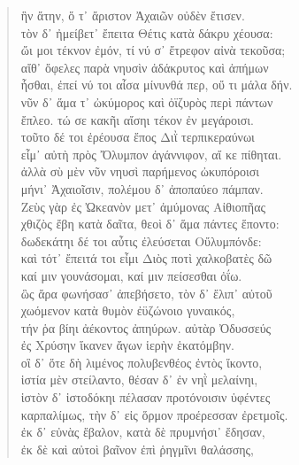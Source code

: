 \begin{Spacing}{1.5}
\begin{verse}
{\large\g ἣν ἄτην, ὅ τ᾽ ἄριστον Ἀχαιῶν οὐδὲν ἔτισεν.  } \\
{\large\g τὸν δ᾽ ἠμείβετ᾽ ἔπειτα Θέτις κατὰ δάκρυ χέουσα:  } \\
{\large\g ὤι μοι τέκνον ἐμόν, τί νύ σ᾽ ἔτρεφον αἰνὰ τεκοῦσα;  } \\
{\large\g αἴθ᾽ ὄφελες παρὰ νηυσὶν ἀδάκρυτος καὶ ἀπήμων  } \\
{\large\g ἧσθαι, ἐπεί νύ τοι αἶσα μίνυνθά περ, οὔ τι μάλα δήν.  } \\
{\large\g νῦν δ᾽ ἅμα τ᾽ ὠκύμορος καὶ ὀϊζυρὸς περὶ πάντων  } \\
{\large\g ἔπλεο. τώ σε κακῆι αἴσηι τέκον ἐν μεγάροισι.  } \\
{\large\g τοῦτο δέ τοι ἐρέουσα ἔπος Διῒ τερπικεραύνωι  } \\
{\large\g εἶμ᾽ αὐτὴ πρὸς Ὄλυμπον ἀγάννιφον, αἴ κε πίθηται.  } \\
{\large\g ἀλλὰ σὺ μὲν νῦν νηυσὶ παρήμενος ὠκυπόροισι  } \\
{\large\g μήνι᾽ Ἀχαιοῖσιν, πολέμου δ᾽ ἀποπαύεο πάμπαν.  } \\
{\large\g Ζεὺς γὰρ ἐς Ὠκεανὸν μετ᾽ ἀμύμονας Αἰθιοπῆας  } \\
{\large\g χθιζὸς ἔβη κατὰ δαῖτα, θεοὶ δ᾽ ἅμα πάντες ἕποντο:  } \\
{\large\g δωδεκάτηι δέ τοι αὖτις ἐλεύσεται Οὔλυμπόνδε:  } \\
{\large\g καὶ τότ᾽ ἔπειτά τοι εἶμι Διὸς ποτὶ χαλκοβατὲς δῶ  } \\
{\large\g καί μιν γουνάσομαι, καί μιν πείσεσθαι ὀΐω.  } \\
{\large\g ὣς ἄρα φωνήσασ᾽ ἀπεβήσετο, τὸν δ᾽ ἔλιπ᾽ αὐτοῦ  } \\
{\large\g χωόμενον κατὰ θυμὸν ἐϋζώνοιο γυναικός,  } \\
{\large\g τήν ῥα βίηι ἀέκοντος ἀπηύρων. αὐτὰρ Ὀδυσσεύς  } \\
{\large\g ἐς Χρύσην ἵκανεν ἄγων ἱερὴν ἑκατόμβην.  } \\
{\large\g οἳ δ᾽ ὅτε δὴ λιμένος πολυβενθέος ἐντὸς ἵκοντο,  } \\
{\large\g ἱστία μὲν στείλαντο, θέσαν δ᾽ ἐν νηῒ μελαίνηι,  } \\
{\large\g ἱστὸν δ᾽ ἱστοδόκηι πέλασαν προτόνοισιν ὑφέντες  } \\
{\large\g καρπαλίμως, τὴν δ᾽ εἰς ὅρμον προέρεσσαν ἐρετμοῖς.  } \\
{\large\g ἐκ δ᾽ εὐνὰς ἔβαλον, κατὰ δὲ πρυμνήσι᾽ ἔδησαν,  } \\
{\large\g ἐκ δὲ καὶ αὐτοὶ βαῖνον ἐπὶ ῥηγμῖνι θαλάσσης,  } \\

\end{verse}
\end{Spacing}
